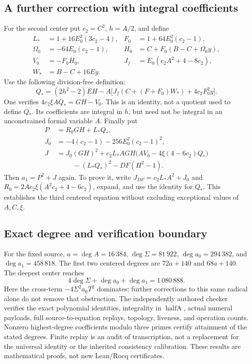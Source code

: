 \documentclass[11pt]{article}
\begin{document}
\subsection{A further correction with integral coefficients}
For the second center put $c_2=C^2$, $h=A/2$, and define
\begin{align*}
 L_*&=1+16E_0^2(3c_2-4),& F_0&=1+64E_0^2(c_2-1),\\
 \Omega_0&=-64E_0(c_2-1),& H_0&=C+F_0(B-C+\Omega_0y),\\
 V_0&=-F_0H_0,& J_f&=E_0(c_2A^2+4-8c_2),\\
 W_*&=B-C+16Ey.
\end{align*}
Use the following division-free definition:
\[
 Q_*=(2h^2-2)EH-A\bigl[J_f(C+(F+F_0)W_*)+4c_2F_0^2y\bigr].
\]
One verifies $4c_2\xi A Q_*=GH-V_0$. This is an identity, not a quotient
used to define $Q_*$. Its coefficients are integral in $h$, but need not
be integral in an unconstrained formal variable $A$.
Finally put
\begin{align*}
 P&=R_0GH+L_*Q_*,\\
 J_0&=-4(c_2-1)-256E_0^2(c_2-1)^2,\\
 J&=J_0(GH)^2+c_2L_*AGH\bigl(AV_0-4\xi(4-6c_2)Q_*\bigr)\\
 &\hspace{1cm}-(L_*Q_*)^2-DF(H^2-1).
\end{align*}
Then $a_1=P^2+J$ again. To prove it, write
$J_{DF}=c_2L_*A^2+J_0$ and
$R_0=2Ac_2\xi(A^2c_2+4-6c_2)$, expand, and use the identity for $Q_*$.
This establishes the third centered equation without excluding exceptional
values of $A,C,\xi$.

\subsection{Exact degree and verification boundary}
For the fixed source, $a=\deg A=16\,384$,
$\deg\Sigma=81\,922$, $\deg a_0=294\,382$, and
$\deg a_1=458\,818$. The first two centered degrees are
$72a+140$ and $68a+140$. The deepest center reaches
\[
 4\deg\Sigma+\deg a_0+\deg a_1=1\,080\,888.
\]
Here the cross-term $-4\Sigma^2a_0T^2$ dominates; further corrections to
this same radical alone do not remove that obstruction.
The independently authored checker verifies the exact polynomial
identities, integrality in $\operatorname{halfA}$, actual numeral payloads,
full source-to-equation replays, topology, liveness, and operation counts.
Nonzero highest-degree coefficients modulo three primes certify attainment
of the stated degrees. Finite replay is an audit of transcription, not a
replacement for the universal identity or the inherited consistency
calibration. These results are mathematical proofs, not new Lean/Rocq
certificates.
\end{document}
